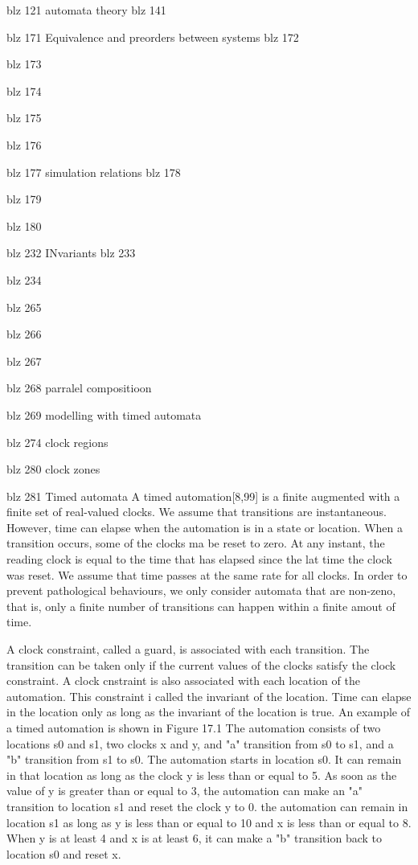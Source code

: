 blz 121
automata theory
blz 141



blz 171
Equivalence and preorders between systems
blz 172

blz 173


blz 174


blz 175


blz 176


blz 177
simulation relations
blz 178

blz 179

blz 180


blz 232
INvariants
blz 233


blz 234


blz 265

blz 266

blz 267


blz 268 parralel compositioon


blz 269 modelling with timed automata

blz 274 clock regions

blz 280 clock zones

blz 281
Timed automata
A timed automation[8,99] is a finite augmented with a finite set of  real-valued clocks. We assume that transitions are instantaneous. However, time can elapse when the automation is in a state or location. When a transition occurs, some of the clocks ma be reset to zero. At any instant, the reading clock is equal to the time that has elapsed since the lat time the clock was reset. We assume that time passes at the same rate for all clocks. In order to prevent pathological behaviours, we only consider automata that are non-zeno, that is, only a finite number of transitions can happen within a finite amout of time.

A clock constraint, called a guard, is associated with each transition. The transition can be taken only if the current values of the clocks satisfy the clock constraint. A clock cnstraint is also associated with each location of the automation. This constraint i called the invariant of the location. Time can elapse in the location only as long as the invariant of the location is true. An example of a timed automation is shown in Figure 17.1 The automation consists of two locations s0 and s1, two clocks x and y, and "a" transition from s0 to s1, and a "b" transition from s1 to s0. The automation starts in location s0. It can remain in that location as long as the clock y is less than or equal to 5. As soon as the value of y is greater than or equal to 3, the  automation can make an "a" transition to location s1 and reset the clock y to 0. the automation can remain in location s1 as long as y is less than or equal to 10 and x is less than or equal to 8. When y is at least 4 and x is at least 6, it can make a "b" transition back to location s0 and reset x.

